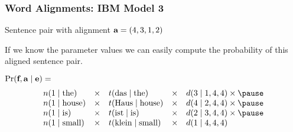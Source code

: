 \begin{frame}
\frametitle{Word Alignments: IBM Model 3}
\begin{block}{Sentence pair with alignment $\textbf{a} = (4,3,1,2)$}
\end{block}\pause
If we know the parameter values we can easily compute the probability of this aligned sentence pair.
\begin{block}{$\Pr(\textbf{f}, \textbf{a} \mid \textbf{e}) = $}
\[
\begin{array}{lllll}
n(1 \mid \textrm{the}) & \times & t(\textrm{das} \mid \textrm{the}) & \times & d(3 \mid 1, 4, 4) \times \pause \\
n(1 \mid \textrm{house}) & \times & t(\textrm{Haus} \mid \textrm{house}) & \times & d(4 \mid 2, 4, 4) \times \pause \\
n(1 \mid \textrm{is}) & \times & t(\textrm{ist} \mid \textrm{is}) & \times & d(2 \mid 3, 4, 4) \times \pause \\
n(1 \mid \textrm{small}) & \times & t(\textrm{klein} \mid \textrm{small}) & \times & d(1 \mid 4, 4, 4)
\end{array}
\]
\end{block}
\end{frame}

